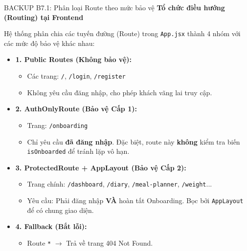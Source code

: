 \documentclass[10pt, aspectratio=169]{beamer}
\begin{document}
\begin{frame}[fragile, label=b7_1]{BACKUP B7.1: Phân loại Route theo mức bảo vệ}
\hypertarget{b7_1_target}{}
    \textbf{Tổ chức điều hướng (Routing) tại Frontend}
    \vspace{0.1cm}
    
    \small
    Hệ thống phân chia các tuyến đường (Route) trong \texttt{App.jsx} thành 4 nhóm với các mức độ bảo vệ khác nhau:
    
    \begin{itemize}
        \item \textbf{1. Public Routes (Không bảo vệ):} 
        \begin{itemize}
            \item Các trang: \texttt{/}, \texttt{/login}, \texttt{/register}
            \item Không yêu cầu đăng nhập, cho phép khách vãng lai truy cập.
        \end{itemize}
        
        \item \textbf{2. AuthOnlyRoute (Bảo vệ Cấp 1):}
        \begin{itemize}
            \item Trang: \texttt{/onboarding}
            \item Chỉ yêu cầu \textbf{đã đăng nhập}. Đặc biệt, route này \textbf{không} kiểm tra biến \texttt{isOnboarded} để tránh lặp vô hạn.
        \end{itemize}
        
        \item \textbf{3. ProtectedRoute + AppLayout (Bảo vệ Cấp 2):}
        \begin{itemize}
            \item Trang chính: \texttt{/dashboard}, \texttt{/diary}, \texttt{/meal-planner}, \texttt{/weight}...
            \item Yêu cầu: Phải đăng nhập \textbf{VÀ} hoàn tất Onboarding. Bọc bởi \texttt{AppLayout} để có chung giao diện.
        \end{itemize}
        
        \item \textbf{4. Fallback (Bắt lỗi):}
        \begin{itemize}
            \item Route \texttt{*} $\rightarrow$ Trả về trang 404 Not Found.
        \end{itemize}
    \end{itemize}
\end{frame}
\end{document}
